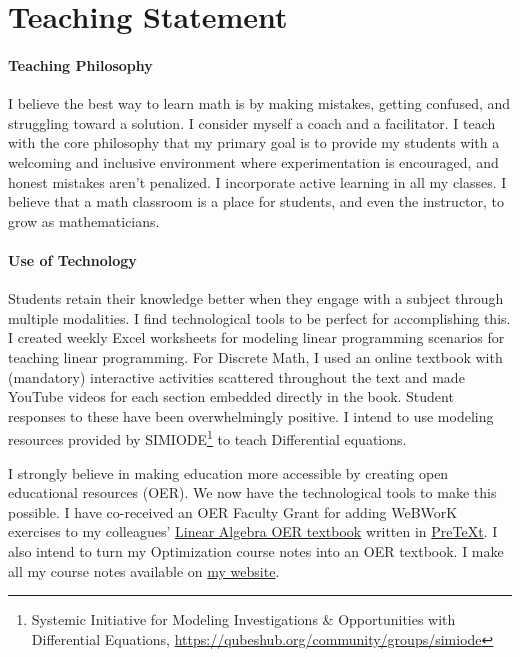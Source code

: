 \documentclass[
]{report}
\begin{document}
\hypertarget{teaching-statement}{%
\chapter{Teaching Statement}\label{teaching-statement}}

\hypertarget{teaching-philosophy}{%
\subsubsection*{Teaching Philosophy}\label{teaching-philosophy}}


I believe the best way to learn math is by making mistakes, getting confused, and struggling toward a solution. I consider myself a coach and a facilitator. I teach with the core philosophy that my primary goal is to provide my students with a welcoming and inclusive environment where experimentation is encouraged, and honest mistakes aren't penalized. I incorporate active learning in all my classes. I believe that a math classroom is a place for students, and even the instructor, to grow as mathematicians.

\hypertarget{use-of-technology}{%
\subsubsection*{Use of Technology}\label{use-of-technology}}


Students retain their knowledge better when they engage with a subject through multiple modalities. I find technological tools to be perfect for accomplishing this. I created weekly Excel worksheets for modeling linear programming scenarios for teaching linear programming. For Discrete Math, I used an online textbook with (mandatory) interactive activities scattered throughout the text and made YouTube videos for each section embedded directly in the book. Student responses to these have been overwhelmingly positive.
I intend to use modeling resources provided by SIMIODE\footnote{Systemic Initiative for Modeling Investigations \& Opportunities with Differential Equations, \url{https://qubeshub.org/community/groups/simiode}} to teach Differential equations.

I strongly believe in making education more accessible by creating open educational resources (OER). We now have the technological tools to make this possible. I have co-received an OER Faculty Grant for adding WeBWorK exercises to my colleagues' \href{http://linear-algebra.northwestern.pub/frontmatter-1.html}{Linear Algebra OER textbook} written in \href{https://pretextbook.org/}{PreTeXt}. I also intend to turn my Optimization course notes into an OER textbook. I make all my course notes available on \href{https://apurvanakade.github.io/math-notes.html}{my website}.
\end{document}
